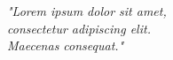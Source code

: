 \thispagestyle{plain}

\begin{center}

\mbox{}
\vfill

\begin{flushright}
\textit{"Lorem ipsum dolor sit amet,\\ consectetur adipiscing elit.\\
Maecenas consequat."}
\end{flushright}

\newpage

\end{center}
